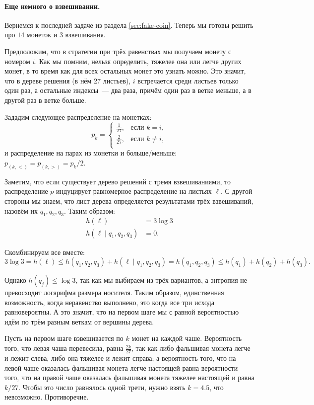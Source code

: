 \paragraph{Еще немного о взвешивании.} Вернемся к последней задаче из раздела \ref{sec:fake-coin}. Теперь мы
готовы решить про $14$ монеток и $3$ взвешивания.

Предположим, что в стратегии при трёх равенствах мы получаем монету с номером $i$. Как мы помним, нельзя
определить, тяжелее она или легче других монет, в то время как для всех остальных монет это узнать
можно. Это значит, что в дереве решения (в нём $27$ листьев), $i$ встречается среди листьев только один
раз, а остальные индексы~--- два раза, причём один раз в ветке меньше, а в другой раз в ветке больше.

Зададим следующее распределение на монетках:
$$
    p_k =
    \begin{cases}
        \frac{1}{27}, &\text{если } k = i,\\
        \frac{2}{27}, &\text{если } k \ne i,\\
    \end{cases}
$$    
и распределение на парах из монетки и больше/меньше: $ p_{(k, <)} = p_{(k, >)} = p_k / 2$.

Заметим, что если существует дерево решений с тремя взвешиваниями, то распределение $p$ индуцирует
равномерное распределение на листьях $\ell$. С другой стороны мы знаем, что лист дерева определяется  
результатами трёх взвешиваний, назовём их $q_1, q_2, q_3$. Таким образом:
\begin{align*}
  h(\ell) &= 3 \log 3\\
  h(\ell \mid q_1, q_2, q_3) &= 0.
\end{align*}

Скомбинируем все вместе:
$$
    3\log 3 = h(\ell) \le h(q_1, q_2, q_3) +h(\ell \mid q_1, q_2, q_3) = h(q_1, q_2, q_3) \le h(q_1) +
    h(q_2) + h(q_3).
$$
    
Однако $h(q_j) \le \log 3$, так как мы выбираем из трёх вариантов, а энтропия не превосходит
логарифма размера носителя. Таким образом, единственная возможность, когда неравенство выполнено, это
когда все три исхода равновероятны. А это значит, что на первом шаге мы с равной вероятностью идём по
трём разным веткам от вершины дерева.

Пусть на первом шаге взвешивается по $k$ монет на каждой чаше. Вероятность того, что левая чаша
перевесила, равна $\frac{2k}{27}$, так как либо фальшивая монета легче и лежит слева, либо она тяжелее и
лежит справа; а вероятность того, что на левой чаше оказалась фальшивая монета легче настоящей равна
вероятности того, что на правой чаше оказалась фальшивая монета тяжелее настоящей и равна $k / 27$. Чтобы
это число равнялось одной трети, нужно взять $k = 4.5$, что невозможно. Противоречие.


